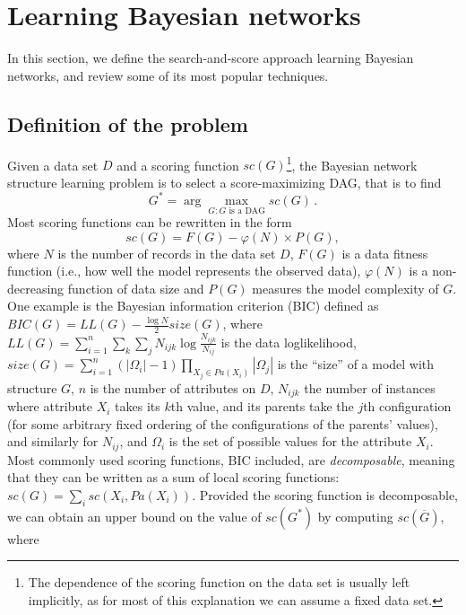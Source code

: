 \section{Learning Bayesian networks}
\label{sec:learning}

In this section, we define the search-and-score approach learning
Bayesian networks, and review some of its most popular techniques.

\subsection{Definition of the problem}
\label{subsec:definition}

Given a data set $D$ and a scoring function ${sc}(G)$\footnote{The dependence of the scoring function on the data set is usually left implicitly, as for most of this explanation we can assume a fixed data set.}, the Bayesian network structure learning problem is to select a score-maximizing DAG, that is to find
\begin{equation} \label{optimal}
  G^* = \arg\max_{G: G \text{ is a DAG}} {sc}( G ) \, .
\end{equation}
Most scoring functions can be rewritten in the form
	\begin{equation}
		\label{eq:scoringfunction}
		{sc}( G ) = F( G ) - \varphi( N ) \times P( G ) ,
	\end{equation}
where $N$ is the number of records in the data set $D$, $F( G )$ is a data fitness function (i.e., how well the model represents the observed data), $\varphi( N )$ is a non-decreasing function of data size and $P( G )$ measures the model complexity of $G$. One example is the Bayesian information criterion (BIC) defined as ${BIC}( G ) = {LL}( G ) - \frac{\log N}{2} {size}( G )$, where ${LL}( G ) = \sum_{i=1}^{n} \sum_{k} \sum_{j} N_{ijk} \log \frac{N_{ijk}}{N_{ij}}$ is the data loglikelihood, ${size}( G ) = \sum_{i=1}^{n} ( |\Omega_i| - 1 ) \prod_{X_j \in {Pa}( X_i )} |\Omega_j|$ is the ``size'' of a model with structure $G$, $n$ is the number of attributes on $D$, $N_{ijk}$ the number of instances where attribute $X_i$ takes its $k$th value, and its parents take the $j$th configuration (for some arbitrary fixed ordering of the configurations of the parents' values), and similarly  for $N_{ij}$, and $\Omega_i$ is the set of possible values for the attribute $X_i$.
Most commonly used scoring functions, BIC included, are \emph{decomposable}, meaning that they can be written as a sum of local scoring functions: ${sc}(G)=\sum_i {sc}(X_i, {Pa}(X_i))$. Provided the scoring function is decomposable, we can obtain an upper bound on the value of $sc(G^*)$ by computing $sc(\overline{G})$, where
